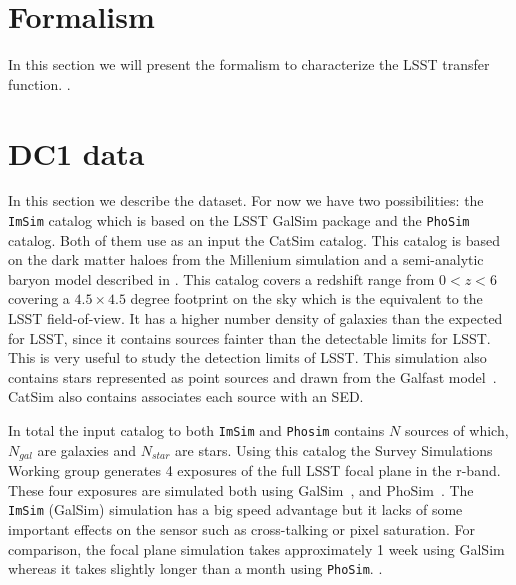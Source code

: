 \documentclass[\docopts]{\docclass}
\begin{document}
\section{Formalism}

In this section we will present the formalism to characterize the LSST transfer function. .


\section{DC1 data}
\label{sec:data}
In this section we describe the dataset. For now we have two possibilities: the \texttt{ImSim} catalog which is based on the LSST GalSim package and the \texttt{PhoSim} catalog. Both of them use as an input the CatSim catalog. This catalog is based on the dark matter haloes from the Millenium simulation and a semi-analytic baryon model described in \citep{2006MNRAS.366..499D}. This catalog covers a redshift range from $0 < z < 6$ covering a $4.5 \times 4.5$ degree footprint on the sky which is the equivalent to the LSST field-of-view. It has a higher number density of galaxies than the expected for LSST, since it contains sources fainter than the detectable limits for LSST. This is very useful to study the detection limits of LSST. This simulation also contains stars represented as point sources and drawn from the Galfast model~\citep{2008ApJ...673..864J}. CatSim also contains associates each source with an SED.

In total the input catalog to both \texttt{ImSim} and \texttt{Phosim} contains $N$ sources of which, $N_{gal}$ are galaxies and $N_{star}$ are stars. Using this catalog the Survey Simulations Working group generates 4 exposures of the full LSST focal plane in the r-band. These four exposures are simulated both using GalSim~\citep{2015A&C....10..121R}, and PhoSim~\citep{2015ApJS..218...14P}. The \texttt{ImSim} (GalSim) simulation has a big speed advantage but it lacks of some important effects on the sensor such as cross-talking or pixel saturation. For comparison, the focal plane simulation takes approximately 1 week using GalSim whereas it takes slightly longer than a month using \texttt{PhoSim}. .
\end{document}
